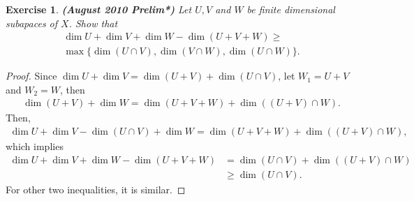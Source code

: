 \documentclass[11pt]{book}
\newtheorem{exercise}{Exercise}[section]
\theoremstyle{definition}
\numberwithin{equation}{subsection}
\begin{document}
\medskip

\begin{exercise}{\bf (August 2010 Prelim*)}
Let $U, V$ and $W$ be finite dimensional subapaces of $X$. Show that
\begin{align*}
    \dim U + \dim V + \dim W - \dim (U + V + W) \geq \\
    \max \{\dim(U \cap V), \dim(V \cap W), \dim(U \cap W)\}.
\end{align*}
\end{exercise}
\begin{proof}
Since $\dim U + \dim V = \dim (U + V) + \dim (U \cap V)$, let $W_1 = U + V$ and $W_2 = W$, then 
\begin{align*}
    \dim (U+V) + \dim W = \dim (U + V + W) + \dim ((U+V) \cap W).
\end{align*}
Then,
\begin{align*}
    \dim U + \dim V - \dim (U \cap V) + \dim W = \dim (U + V + W) + \dim ((U+V) \cap W),
\end{align*}
which implies
\begin{align*}
    \dim U + \dim V + \dim W - \dim (U + V + W) & = \dim (U \cap V) + \dim ((U+V) \cap W) \\
    & \geq \dim (U \cap V).
\end{align*}
For other two inequalities, it is similar.
\end{proof}

\medskip
\end{document}
